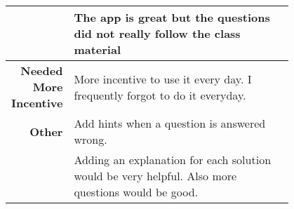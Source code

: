 {\begin{longtable}{R|p{0.8\linewidth}}
		& The app is great but the questions did not really follow the class material                                                                                                                                                                                                                                                                                                                                                                                                                                                                                                                                                                                                                                                                      \\
		\hline
		\textbf{Needed More Incentive} & More incentive to use it every day. I frequently forgot to do it everyday.                                                                                                                                                                                                                                                                                                                                                                                                                                                                                                                                                                                                                                                                       \\
		\hline
		\textbf{Other} & Add hints when a question is answered wrong.                                                                                                                                                                                                                                                                                                                                                                                                                                                                                                                                                                                                                                                                                                     \\
		& Adding an explanation for each solution would be very helpful.  Also more questions would be good.                                                                                                                                                                                                                                                                                                                                                                                                                                                                                                                                                                                                                                               \\

\end{longtable}}
